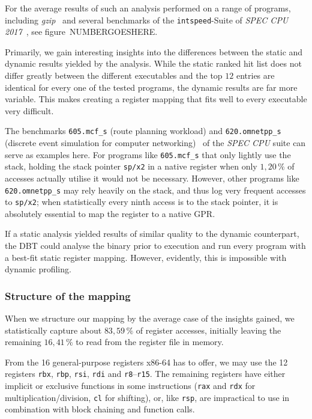 For the average results of such an analysis performed on a range of programs, including \textit{gzip}~\cite{gzip} and several benchmarks of the \texttt{intspeed}-Suite of \textit{SPEC CPU 2017}~\cite{spec-cpu-2017}, see figure~NUMBERGOESHERE.

Primarily, we gain interesting insights into the differences between the static and dynamic results yielded by the analysis.
While the static ranked hit list does not differ greatly between the different executables and the top $12$ entries are identical for every one of the tested programs, the dynamic results are far more variable.
This makes creating a register mapping that fits well to every executable very difficult.

The benchmarks \texttt{605.mcf\_s} (route planning workload) and \texttt{620.omnetpp\_s} (discrete event simulation for computer networking)~\cite{spec-cpu-doc} of the \textit{SPEC CPU} suite can serve as examples here.
For programs like \texttt{605.mcf\_s} that only lightly use the stack, holding the stack pointer \texttt{sp/x2} in a native register when only $1,20\,\%$ of accesses actually utilise it would not be necessary.
However, other programs like \texttt{620.omnetpp\_s} may rely heavily on the stack, and thus log very frequent accesses to \texttt{sp/x2};
when statistically every ninth access is to the stack pointer, it is absolutely essential to map the register to a native GPR\@.

If a static analysis yielded results of similar quality to the dynamic counterpart, the DBT could analyse the binary prior to execution and run every program with a best-fit static register mapping.
However, evidently, this is impossible with dynamic profiling.


\subsubsection{Structure of the mapping}
When we structure our mapping by the average case of the insights gained, we statistically capture about $83,59\,\%$ of register accesses, initially leaving the remaining $16,41\,\%$ to read from the register file in memory.

From the 16 general-purpose registers x86-64 has to offer, we may use the 12 registers \texttt{rbx}, \texttt{rbp}, \texttt{rsi}, \texttt{rdi} and \texttt{r8}--\texttt{r15}.
The remaining registers have either implicit or exclusive functions in some instructions (\texttt{rax} and \texttt{rdx} for multiplication/division, \texttt{cl} for shifting), or, like \texttt{rsp}, are impractical to use in combination with block chaining and function calls.

